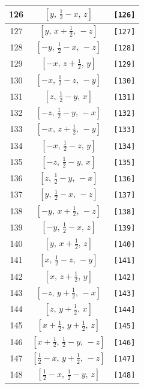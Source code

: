 \documentclass[fleqn,8pt]{jsarticle}
\begin{document}
\begin{longtable}{ccc}
126 & $\left[ y,\, \frac{1}{2} - x,\, z \right]$ & {\tt [126]} \\ \hline
127 & $\left[ y,\, x + \frac{1}{2},\, - z \right]$ & {\tt [127]} \\ \hline
128 & $\left[ - y,\, \frac{1}{2} - x,\, - z \right]$ & {\tt [128]} \\ \hline
129 & $\left[ - x,\, z + \frac{1}{2},\, y \right]$ & {\tt [129]} \\ \hline
130 & $\left[ - x,\, \frac{1}{2} - z,\, - y \right]$ & {\tt [130]} \\ \hline
131 & $\left[ z,\, \frac{1}{2} - y,\, x \right]$ & {\tt [131]} \\ \hline
132 & $\left[ - z,\, \frac{1}{2} - y,\, - x \right]$ & {\tt [132]} \\ \hline
133 & $\left[ - x,\, z + \frac{1}{2},\, - y \right]$ & {\tt [133]} \\ \hline
134 & $\left[ - x,\, \frac{1}{2} - z,\, y \right]$ & {\tt [134]} \\ \hline
135 & $\left[ - z,\, \frac{1}{2} - y,\, x \right]$ & {\tt [135]} \\ \hline
136 & $\left[ z,\, \frac{1}{2} - y,\, - x \right]$ & {\tt [136]} \\ \hline
137 & $\left[ y,\, \frac{1}{2} - x,\, - z \right]$ & {\tt [137]} \\ \hline
138 & $\left[ - y,\, x + \frac{1}{2},\, - z \right]$ & {\tt [138]} \\ \hline
139 & $\left[ - y,\, \frac{1}{2} - x,\, z \right]$ & {\tt [139]} \\ \hline
140 & $\left[ y,\, x + \frac{1}{2},\, z \right]$ & {\tt [140]} \\ \hline
141 & $\left[ x,\, \frac{1}{2} - z,\, - y \right]$ & {\tt [141]} \\ \hline
142 & $\left[ x,\, z + \frac{1}{2},\, y \right]$ & {\tt [142]} \\ \hline
143 & $\left[ - z,\, y + \frac{1}{2},\, - x \right]$ & {\tt [143]} \\ \hline
144 & $\left[ z,\, y + \frac{1}{2},\, x \right]$ & {\tt [144]} \\ \hline
145 & $\left[ x + \frac{1}{2},\, y + \frac{1}{2},\, z \right]$ & {\tt [145]} \\ \hline
146 & $\left[ x + \frac{1}{2},\, \frac{1}{2} - y,\, - z \right]$ & {\tt [146]} \\ \hline
147 & $\left[ \frac{1}{2} - x,\, y + \frac{1}{2},\, - z \right]$ & {\tt [147]} \\ \hline
148 & $\left[ \frac{1}{2} - x,\, \frac{1}{2} - y,\, z \right]$ & {\tt [148]} \\ \hline

\end{longtable}
\end{document}
